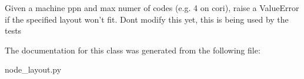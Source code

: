 \begin{DoxyVerb}Given a machine ppn and max numer of codes (e.g. 4 on cori),
raise a ValueError if the specified layout won't fit.
Dont modify this yet, this is being used by the tests\end{DoxyVerb}
 

The documentation for this class was generated from the following file\+:\begin{DoxyCompactItemize}
\item 
node\+\_\+layout.\+py\end{DoxyCompactItemize}

